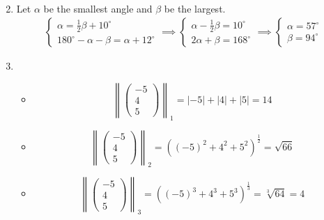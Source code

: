 \documentclass{article}
\newcommand*{\mat}[1]{\begin{pmatrix}#1\end{pmatrix}}
\begin{document}
\begin{enumerate}
{\begin{enumerate}
{\begin{gather*}
                    \end{gather*}
                }
            \end{enumerate}
        }
        \item {
            Let \(\alpha\) be the smallest angle and \(\beta\) be the largest.
            \begin{gather*}
                \begin{cases}
                    \alpha = \frac{1}{2}\beta + 10^\circ \\
                    180^\circ - \alpha - \beta = \alpha + 12^\circ
                \end{cases}
                \implies
                \begin{cases}
                    \alpha - \frac{1}{2}\beta = 10^\circ \\
                    2\alpha + \beta = 168^\circ
                \end{cases}
                \implies
                \begin{cases}
                    \alpha = 57^\circ \\
                    \beta = 94^\circ
                \end{cases}
            \end{gather*}
        }
        \item {
            \begin{itemize}
                \item {
                    \begin{displaymath}
                        \left\|\mat{-5 \\ 4 \\ 5}\right\|_1 = |-5|+|4|+|5| = 14
                    \end{displaymath}
                } 
                \item {
                    \begin{displaymath}
                        \left\|\mat{-5\\4\\5}\right\|_2 = \left((-5)^2+4^2+5^2\right)^\frac{1}{2} = \sqrt{66}
                    \end{displaymath}
                }
                \item {
                    \begin{displaymath}
                        \left\|\mat{-5\\4\\5}\right\|_3 = \left((-5)^3+4^3+5^3\right)^\frac{1}{3} = \sqrt[3]{64} = 4

\end{displaymath}}
\end{itemize}}
\end{enumerate}
\end{document}
